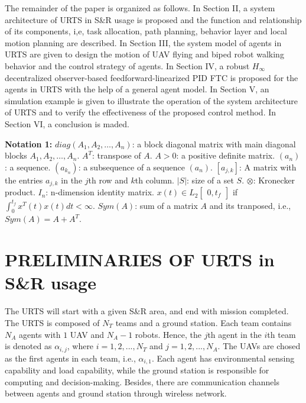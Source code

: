 \documentclass{ieeeaccess}
\begin{document}
The remainder of the paper is organized as follows. In Section II, a system architecture of URTS in S\&R usage is proposed and the function and relationship of its components, i,e, task allocation, path planning, behavior layer and local motion planning are described. In Section III, the system model of agents in URTS are given to design the motion of UAV flying and biped robot walking behavior and the control strategy of agents. In Section IV, a robust $H_\infty$ decentralized observer-based feedforward-linearized PID FTC is proposed for the agents in URTS with the help of a general agent model. In Section V, an simulation example is given to illustrate the operation of the system architecture of URTS and to verify the effectiveness of the proposed control method. In Section VI, a conclusion is maded.

\textbf{Notation 1:} 
$diag(A_1, A_2, \dots, A_n)$: a block diagonal matrix with main diagonal blocks $A_1, A_2, \dots, A_n$. $A^T$: transpose of $A$. $A > 0$: a positive definite matrix. $(a_n)$: a sequence. $(a_{k_n})$: a subsequence of a sequence $(a_n)$. $[a_{j,k}]$: A matrix with the entries $a_{j,k}$ in the $j$th row and $k$th column. $\vert{S}\vert$: size of a set $S$. $\otimes$: Kronecker product. $I_n$: n-dimension identity matrix. $x(t)\in L_2\begin{bmatrix}
    0,t_f 
\end{bmatrix}$ if $\int^{t_f}_{0}x^T(t)x(t)dt<\infty$. $Sym(A)$: sum of a matrix $A$ and its tranposed, i.e., $Sym(A) = A+A^T$.

\section{PRELIMINARIES OF URTS in S\&R usage}
The URTS will start with a given S\&R area, and end with mission completed. The URTS is composed of $N_T$ teams and a ground station. Each team contains $N_A$ agents with $1$ UAV and $N_A-1$ robots. Hence, the $j$th agent in the $i$th team is denoted as $\alpha_{i,j}$, where $i=1,2,...,N_T$ and $j=1,2,...,N_A$. The UAVs are chosed as the first agents in each team, i.e., $\alpha_{i,1}$. Each agent has environmental sensing capability and load capability, while the ground station is responsible for computing and decision-making. Besides, there are communication channels between agents and ground station through wireless network.
\end{document}
